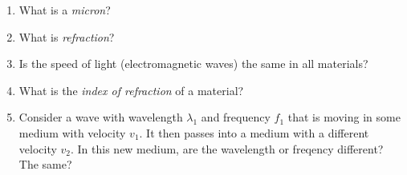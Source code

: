 \documentclass{tufte-handout}
\begin{document}
\begin{enumerate}
\item What is a {\it micron}?

\item What is {\it refraction}?

\item Is the speed of light (electromagnetic waves) the same in all materials?

\item What is the {\it index of refraction} of a material?

\item Consider a wave with wavelength $\lambda_1$ and frequency $f_1$ that is moving in some medium
with velocity $v_1$. It then passes into a medium with a different velocity $v_2$. In this new
medium, are the wavelength or freqency different? The same?

\end{enumerate}
\end{document}
